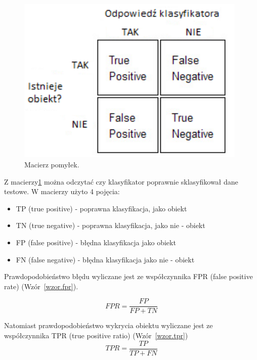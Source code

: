\documentclass[a4paper,twoside,12pt]{book}
\begin{document}
    \begin{figure}
        \centering
        \includegraphics[width=11cm]{Obrazy/ConfusionMatrix.jpg}
        \caption{Macierz pomyłek.}
        \label{fig.ConfusionMatrix}
    \end{figure}

    Z macierzy\ref{fig.ConfusionMatrix} można odczytać czy klasyfikator poprawnie sklasyfikował dane testowe.
    W macierzy użyto 4 pojęcia:
    \begin{itemize}
        \item TP (true positive) - poprawna klasyfikacja, jako obiekt
        \item TN (true negative) - poprawna klasyfikacja, jako nie - obiekt
        \item FP (false positive) - błędna klasyfikacja jako obiekt
        \item FN (false negative) - błędna klasyfikacja jako nie - obiekt
    \end{itemize}

    Prawdopodobieństwo błędu wyliczane jest ze współczynnika FPR (false positive rate) (Wzór~\ref{wzor.fpr}).

    \large
    \begin{equation}
        FPR= \frac{FP}{FP+TN}
        \label{wzor.fpr}
    \end{equation}
    \normalsize

    Natomiast prawdopodobieństwo wykrycia obiektu wyliczane jest ze współczynnika TPR (true positive ratio)
    (Wzór~\ref{wzor.tpr})
    \large
    \begin{equation}
        TPR= \frac{TP}{TP+FN}
        \label{wzor.tpr}
    \end{equation}
    \normalsize
\end{document}
